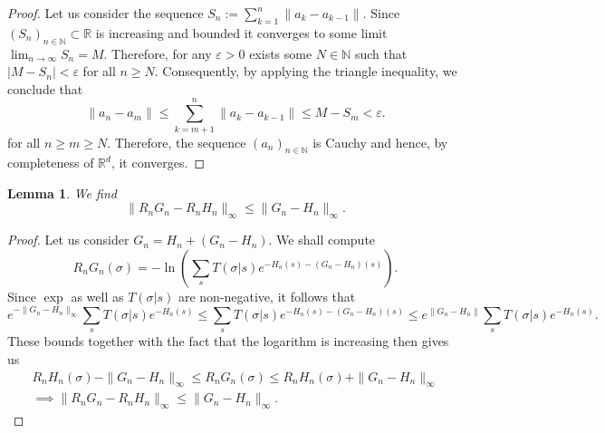 \documentclass{article}
\newtheorem{lemma}[theorem]{Lemma}
\begin{document}
\begin{proof}
    Let us consider the sequence $S_n:=\sum_{k=1}^n\|a_k-a_{k-1}\|$. Since $(S_n)_{n\in\mathds{N}}\subset\mathds{R}$ is increasing and bounded it converges to some limit $\lim_{n\to\infty}S_n=M$. Therefore, for any $\varepsilon>0$ exists some $N\in\mathds{N}$ such that $|M-S_n|<\varepsilon$ for all $n\geq N$. Consequently, by applying the triangle inequality, we conclude that
    \begin{equation}
        \|a_n-a_m\|\leq\sum_{k=m+1}^n\|a_k-a_{k-1}\|\leq M-S_m<\varepsilon.
    \end{equation}
    for all $n\geq m\ge N$. Therefore, the sequence $(a_n)_{n\in\mathds{N}}$ is Cauchy and hence, by completeness of $\mathds{R}^d$, it converges.
\end{proof}

\begin{lemma}\label{Lem3}
    We find
    \begin{equation}
        \|R_nG_n-R_nH_n\|_\infty\leq\|G_n-H_n\|_\infty.
    \end{equation}
\end{lemma}

\begin{proof}
    Let us consider $G_n=H_n+(G_n-H_n)$. We shall compute
    \begin{equation}
        R_nG_n(\sigma)=-\ln\left(\sum_sT(\sigma|s)e^{-H_n(s)-(G_n-H_n)(s)}\right).
    \end{equation}
    Since $\exp$ as well as $T(\sigma|s)$ are non-negative, it follows that
    \begin{equation}
        e^{-\|G_n-H_n\|_\infty}\sum_sT(\sigma|s)e^{-H_n(s)}\leq\sum_sT(\sigma|s)e^{-H_n(s)-(G_n-H_n)(s)}\leq e^{\|G_n-H_n\|}\sum_sT(\sigma|s)e^{-H_n(s)}.
    \end{equation}
    These bounds together with the fact that the logarithm is increasing then gives us
    \begin{align}
        R_nH_n(\sigma)-\|G_n-H_n\|_\infty\leq R_nG_n(\sigma)\leq R_nH_n(\sigma)+\|G_n-H_n\|_\infty\nonumber\\
        \implies \|R_nG_n-R_nH_n\|_\infty\leq\|G_n-H_n\|_\infty.
    \end{align}
\end{proof}
\end{document}
